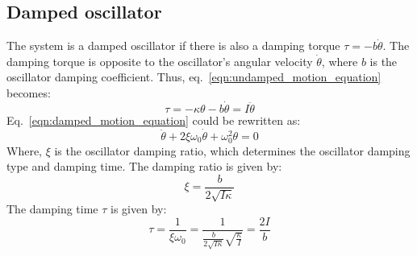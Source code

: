 \documentclass[\main/master.tex]{subfiles}
\begin{document}
\subsection{Damped oscillator}
The system is a damped oscillator if there is also a damping torque $\tau = -b\dot{\theta}$. The damping torque is opposite to the oscillator's angular velocity $\dot{\theta}$, where $b$ is the oscillator damping coefficient. Thus, eq.~\ref{eqn:undamped_motion_equation} becomes:
\begin{equation}
\tau = -\kappa\theta - b\dot{\theta}  = I\ddot{\theta}   \label{eqn:damped_motion_equation}
\end{equation}
Eq.~\ref{eqn:damped_motion_equation} could be rewritten as:
\begin{equation}
\ddot{\theta} + 2\xi\omega_0\dot{\theta} + \omega_0^2\theta = 0   \label{eqn:damped_motion_equation_2}
\end{equation}
Where, $\xi$ is the oscillator damping ratio, which determines the oscillator damping type and damping time. The damping ratio is given by:
\begin{equation}
\xi = \frac{b}{2\sqrt{I\kappa}} 
\label{eqn:system damping ratio}
\end{equation}
The damping time $\tau$ is given by:
\begin{equation}
\tau = \frac{1}{\xi\omega_0} = \frac{1}{\frac{b}{2\sqrt{I\kappa}}\sqrt{\frac{\kappa}{I}} }= \frac{2I}{b}  \label{eqn:damping_time}
\end{equation}
\end{document}
